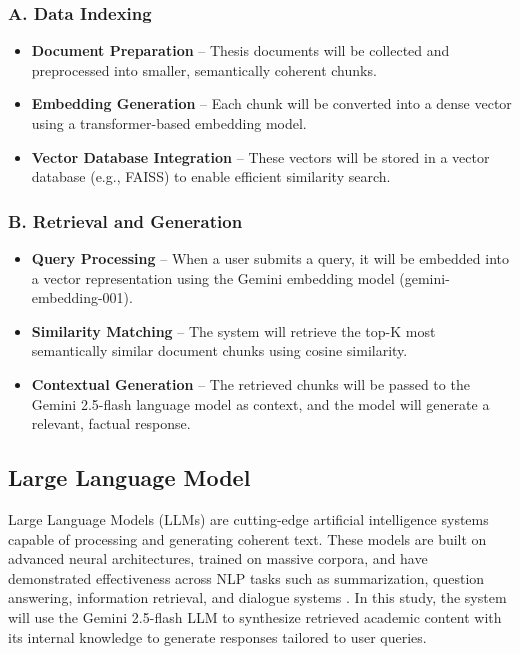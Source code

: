 \begin{refsection}
\subsubsection*{A. Data Indexing}
\begin{itemize}
    \item \textbf{Document Preparation} – Thesis documents will be collected and preprocessed into smaller, semantically coherent chunks.
    \item \textbf{Embedding Generation} – Each chunk will be converted into a dense vector using a transformer-based embedding model.
    \item \textbf{Vector Database Integration} – These vectors will be stored in a vector database (e.g., FAISS) to enable efficient similarity search.
\end{itemize}

\subsubsection*{B. Retrieval and Generation}
\begin{itemize}
    \item \textbf{Query Processing} – When a user submits a query, it will be embedded into a vector representation using the Gemini embedding model (gemini-embedding-001).
    \item \textbf{Similarity Matching} – The system will retrieve the top-K most semantically similar document chunks using cosine similarity.
    \item \textbf{Contextual Generation} – The retrieved chunks will be passed to the Gemini 2.5-flash language model as context, and the model will generate a relevant, factual response.
\end{itemize}


\subsection{Large Language Model}

Large Language Models (LLMs) are cutting-edge artificial intelligence systems capable of processing and generating coherent text. These models are built on advanced neural architectures, trained on massive corpora, and have demonstrated effectiveness across NLP tasks such as summarization, question answering, information retrieval, and dialogue systems \citeauthor{naveed2024} \citeyear{naveed2024}. In this study, the system will use the Gemini 2.5-flash LLM to synthesize retrieved academic content with its internal knowledge to generate responses tailored to user queries.



\end{refsection}
